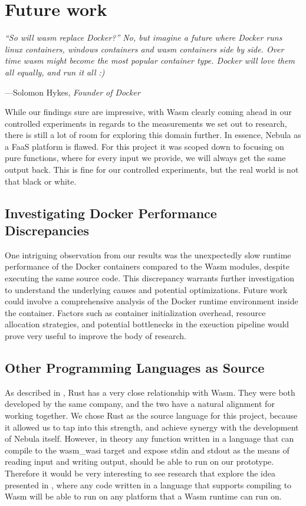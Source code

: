 \documentclass[
  table]{report}
\begin{document}
\newpage
\chapter{Future work}

\setlength{}

\epigraph{\itshape 
“So will wasm replace Docker?” No, but imagine a future where Docker runs linux
containers, windows containers and wasm containers side by side. Over time wasm
might become the most popular container type. Docker will love them all equally,
and run it all :)
}{---Solomon Hykes, \textit{Founder of Docker}}

While our findings sure are impressive, with \ac{Wasm} clearly coming
ahead in our controlled experiments in regards to the measurements we
set out to research, there is still a lot of room for exploring this
domain further. In essence, Nebula as a \ac{FaaS} platform is flawed.
For this project it was scoped down to focusing on pure functions, where
for every input we provide, we will always get the same output back.
This is fine for our controlled experiments, but the real world is not
that black or white.

\section{Investigating Docker Performance Discrepancies}

One intriguing observation from our results was the unexpectedly slow
runtime performance of the Docker containers compared to the \ac{Wasm}
modules, despite executing the same source code. This discrepancy
warrants further investigation to understand the underlying causes and
potential optimizations. Future work could involve a comprehensive
analysis of the Docker runtime environment inside the container. Factors
such as container initialization overhead, resource allocation
strategies, and potential bottlenecks in the exeuction pipeline would
prove very useful to improve the body of research.

\section{Other Programming Languages as Source}

As described in , Rust has a very close
relationship with \ac{Wasm}. They were both developed by the same
company, and the two have a natural alignment for working together. We
chose Rust as the source language for this project, because it allowed
us to tap into this strength, and achieve synergy with the development
of Nebula itself. However, in theory any function written in a language
that can compile to the wasm\_wasi target and expose stdin and stdout as
the means of reading input and writing output, should be able to run on
our prototype. Therefore it would be very interesting to see research
that explore the idea presented in , where any
code written in a language that supports compiling to \ac{Wasm} will be
able to run on any platform that a \ac{Wasm} runtime can run on.
\end{document}
